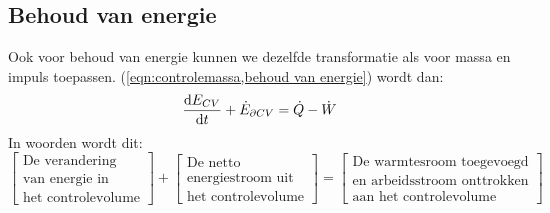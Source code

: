 			\subsection{Behoud van energie}
			\label{sec:Behoud van energie}
Ook voor behoud van energie kunnen we dezelfde transformatie als voor massa en impuls toepassen. (\ref{eqn:controlemassa,behoud van energie}) wordt dan:
\begin{equation}
	\frac{\mathrm{d} E_{CV}}{\mathrm{d} t} + \dot{E}_{\partial CV} =  \dot{Q}-\dot{W}
	\label{eqn:controlevolume,behoud van energie}
\end{equation}
In woorden wordt dit:
\begin{equation}
	\left[
		\begin{array}{c}
			\mbox{De verandering} \\ \mbox{van energie in} \\ \mbox{het controlevolume}
		\end{array}
	\right]
	+
	\left[
		\begin{array}{c}
			\mbox{De netto} \\ \mbox{energiestroom uit} \\ \mbox{het controlevolume}
		\end{array}
	\right]
	=
	\left[
		\begin{array}{c}
			\mbox{De warmtesroom toegevoegd} \\ \mbox{en arbeidsstroom onttrokken} \\ \mbox{aan het controlevolume}
		\end{array}
	\right]
	\label{eqn:controlevolume,behoud van energie,woorden}
\end{equation}

